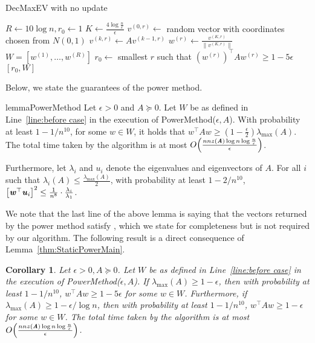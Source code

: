\documentclass[11pt]{article}
\newtheorem{corollary}[theorem]{Corollary}
\let\originalleft\left
\let\originalright\right
\renewcommand{\left}{\mathopen{}\mathclose\bgroup\originalleft}
\renewcommand{\right}{\aftergroup\egroup\originalright}
\newcommand\uu{\boldsymbol{\mathit{u}}}
\newcommand\vv{\boldsymbol{\mathit{v}}}
\newcommand\ww{\boldsymbol{\mathit{w}}}
\renewcommand\AA{\boldsymbol{\mathit{A}}}
\newcommand\WW{\boldsymbol{\mathit{W}}}
\begin{document}
\begin{algorithm}
\caption{{\sc DecMaxEV} with no update}\label{alg:PowerMethod}
 \begin{algorithmic}[1]
\Procedure{PowerMethod}{$\epsilon, \AA$}
\State $R \leftarrow 10\log n, r_0 \leftarrow 1$
\State $K \leftarrow \frac{4\log \frac{n}{\epsilon}}{\epsilon}$
\State $\vv^{(0,r)} \leftarrow $ random vector with coordinates chosen from $N(0,1)$\label{algline:randomInit}
\State $\vv^{(k,r)}\leftarrow \AA\vv^{(k-1,r)}$
\EndFor
\State $\ww^{(r)} \leftarrow \frac{\vv^{(K,r)}}{\|\vv^{(K,r)}\|}$ 
\EndFor
\State $\WW = [\ww^{(1)},\dots,\ww^{(R)}]$\label{line:before case}
\If{ $(\ww^{(r)})^{\top}\AA\ww^{(r)} < 1-\epsilon$ for all $r\le R$}\label{line: if all w 1-eps}
\State {}
\Else
\State $r_0\leftarrow$ smallest $r$ such that $(\ww^{(r)})^{\top}\AA\ww^{(r)} \geq 1-5\epsilon$
\State \Return $[r_0,\WW]$
\EndIf
\EndProcedure 
 \end{algorithmic}
\end{algorithm}
Below, we state the guarantees of the power method.

\begin{restatable}{lemma}{PowerMethod}\label{thm:StaticPowerMain}
Let $\epsilon>0$ and $\AA \succeq 0$. Let $\WW$ be as defined in Line~\ref{line:before case} in the execution of {\sc PowerMethod}($\epsilon,\AA$). With probability at least $1-1/n^{10}$, for some $\ww \in \WW$, it holds that $\ww^{\top}\AA\ww \geq (1-\frac{\epsilon}{2})\lambda_{\max}(\AA)$. The total time taken by the algorithm is at most $O\left(\frac{nnz(\AA)\log n\log \frac{n}{\epsilon}}{\epsilon}\right)$.

Furthermore, let $\lambda_i$ and $\uu_i$ denote the eigenvalues and eigenvectors of $\AA$. For all $i$ such that $\lambda_i (\AA) \leq \frac{\lambda_{\max}(\AA)}{2}$, with probability at least $1-2/n^{10}$, $\left[\ww^{\top}\uu_i\right]^2\leq \frac{1}{n^8}\cdot \frac{\lambda_i}{\lambda_1}$.
\end{restatable}
 We note that the last line of the above lemma is saying that the vectors returned by the power method satisfy , which we state for completeness but is not required by our algorithm. The following result is a direct consequence of Lemma~\ref{thm:StaticPowerMain}.

 \begin{corollary}\label{thm:StaticPower}
 Let $\epsilon>0, \AA \succeq 0$. Let $\WW$ be as defined in Line~\ref{line:before case} in the execution of {\sc PowerMethod}($\epsilon,\AA$). If $\lambda_{\max}(\AA) \ge 1-\epsilon$, then with probability at least $1-1/n^{10}$, $\ww^{\top}\AA\ww\geq 1-5\epsilon$ for some $\ww\in \WW$. Furthermore, if $\lambda_{\max}(\AA) \ge 1-\epsilon/\log n$, then with probability at least $1-1/n^{10}$, $\ww^{\top}\AA\ww\geq 1-\epsilon$ for some $\ww\in \WW$. The total time taken by the algorithm is at most $O\left(\frac{nnz(\AA)\log n\log \frac{n}{\epsilon}}{\epsilon}\right)$.
 \end{corollary}
\end{document}
